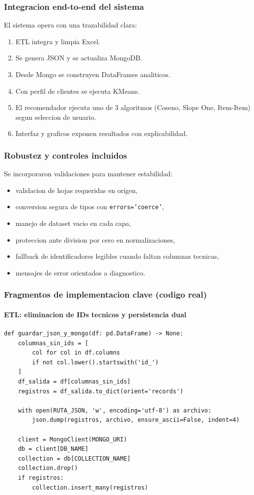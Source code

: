 ﻿\documentclass{article}
\begin{document}
\subsubsection{Integracion end-to-end del sistema}
El sistema opera con una trazabilidad clara:
\begin{enumerate}
    \item ETL integra y limpia Excel.
    \item Se genera JSON y se actualiza MongoDB.
    \item Desde Mongo se construyen DataFrames analiticos.
    \item Con perfil de clientes se ejecuta KMeans.
    \item El recomendador ejecuta uno de 3 algoritmos (Coseno, Slope One, Item-Item) segun seleccion de usuario.
    \item Interfaz y graficos exponen resultados con explicabilidad.
\end{enumerate}

\subsubsection{Robustez y controles incluidos}
Se incorporaron validaciones para mantener estabilidad:
\begin{itemize}
    \item validacion de hojas requeridas en origen,
    \item conversion segura de tipos con \texttt{errors='coerce'},
    \item manejo de dataset vacio en cada capa,
    \item proteccion ante division por cero en normalizaciones,
    \item fallback de identificadores legibles cuando faltan columnas tecnicas,
    \item mensajes de error orientados a diagnostico.
\end{itemize}

\subsubsection{Fragmentos de implementacion clave (codigo real)}

\paragraph{ETL: eliminacion de IDs tecnicos y persistencia dual}
\begin{lstlisting}
def guardar_json_y_mongo(df: pd.DataFrame) -> None:
    columnas_sin_ids = [
        col for col in df.columns
        if not col.lower().startswith('id_')
    ]
    df_salida = df[columnas_sin_ids]
    registros = df_salida.to_dict(orient='records')

    with open(RUTA_JSON, 'w', encoding='utf-8') as archivo:
        json.dump(registros, archivo, ensure_ascii=False, indent=4)

    client = MongoClient(MONGO_URI)
    db = client[DB_NAME]
    collection = db[COLLECTION_NAME]
    collection.drop()
    if registros:
        collection.insert_many(registros)
\end{lstlisting}
\end{document}
